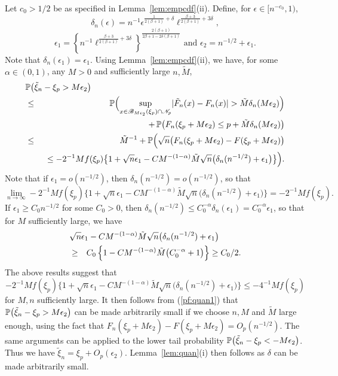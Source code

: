 \documentclass[a4paper, 12pt]{article}
\theoremstyle{plain}
\theoremstyle{definition}
\newcommand{\prob}{{\Bbb P}}
\begin{document}
Let $c_0>1/2$ be as specified in Lemma~\ref{lem:empcdf}(ii). Define, for $\epsilon\in[n^{-c_0},1)$,
\[\delta_n(\epsilon)=
n^{-1}\epsilon^{\frac{1}{2(\beta+1)}+\delta}
\ell^{\frac{\beta+3}{2(\beta+1)}+3\delta},
\]
\[
\epsilon_1=\left\{n^{-1}
\ell^{\frac{\beta+3}{2(\beta+1)}+3\delta}\right\}^{
\frac{2(\beta+1)}{2\beta+1-2\delta(\beta+1)}}
\mbox{\ \ and\ \ }
\epsilon_2=n^{-1/2}+\epsilon_1.
\]
Note that $\delta_n(\epsilon_1)=\epsilon_1$.
Using Lemma~\ref{lem:empcdf}(ii), we have, for some $\alpha\in(0,1)$, any $M>0$ and sufficiently large $n,\tilde{M}$,
\begin{eqnarray}
\lefteqn{\prob\big(\tilde\xi_n-\xi_p>M\epsilon_2\big)}\nonumber\\
&\le& \prob\Big(\underset{x\in\mathscr{B}_{M\epsilon_2}(\xi_p)\cap\mathscr{N}_p}\sup
|\tilde{F}_n(x)-F_n(x)|>\tilde{M}\delta_n(M\epsilon_2)\Big)\nonumber\\
&&\qquad+\,\prob\big(F_n(\xi_p+M\epsilon_2)\le p+\tilde{M}\delta_n(M\epsilon_2)\big)\nonumber\\
&\le&\tilde{M}^{-1}+\prob\Big(\sqrt{n}\big(F_n(\xi_p+M\epsilon_2)-F(\xi_p+M\epsilon_2)\big)\nonumber\\
&&\;\;\le -2^{-1}Mf(\xi_p)\big\{1+
\sqrt{n}\epsilon_1-CM^{-(1-\alpha)}\tilde{M}\sqrt{n}\big(\delta_n(n^{-1/2})+\epsilon_1\big)\big\}\Big).
\label{pf:quan1}
\end{eqnarray}
Note that if $\epsilon_1=o(n^{-1/2})$, then $\delta_n(n^{-1/2})=o(n^{-1/2})$, so that
\[ \underset{n\rightarrow\infty}\lim
-2^{-1}Mf(\xi_p)\big\{1+
\sqrt{n}\epsilon_1-CM^{-(1-\alpha)}\tilde{M}\sqrt{n}\big(\delta_n(n^{-1/2})+\epsilon_1\big)\big\}
=-2^{-1}Mf(\xi_p).\]
If $\epsilon_1\ge C_0n^{-1/2}$ for some $C_0>0$, then $\delta_n(n^{-1/2})\le C_0^{-\alpha}\delta_n(\epsilon_1)=C_0^{-\alpha}\epsilon_1$,
so that for $M$ sufficiently large, we have
\begin{eqnarray*}
\lefteqn{\sqrt{n}\epsilon_1-CM^{-(1-\alpha)}\tilde{M}\sqrt{n}\big(\delta_n(n^{-1/2})+\epsilon_1\big)}\\
&\ge& C_0\left\{1-CM^{-(1-\alpha)}\tilde{M}\big(C_0^{-\alpha}+1\big)\right\}\ge C_0/2.
\end{eqnarray*}
The above results suggest that
\[ -2^{-1}Mf(\xi_p)\big\{1+
\sqrt{n}\epsilon_1-CM^{-(1-\alpha)}\tilde{M}\sqrt{n}\big(\delta_n(n^{-1/2})+\epsilon_1\big)\big\}\le
-4^{-1}Mf(\xi_p) \]
for $M,n$ sufficiently large. It then follows from (\ref{pf:quan1}) that
$\prob\big(\tilde\xi_n-\xi_p>M\epsilon_2\big)$ can be made arbitrarily small if we choose $n,M$ and $\tilde{M}$
large enough, using the fact that $F_n(\xi_p+M\epsilon_2)-F(\xi_p+M\epsilon_2)=O_p(n^{-1/2})$. The same arguments can be applied to
the lower tail probability $\prob\big(\tilde\xi_n-\xi_p<-M\epsilon_2\big)$.
Thus we have $\tilde\xi_n=\xi_p+O_p(\epsilon_2)$. Lemma~\ref{lem:quan}(i) then
follows as $\delta$ can be made arbitrarily small.
\end{document}
